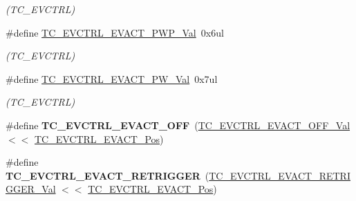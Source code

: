 \begin{DoxyCompactItemize}
\begin{DoxyCompactList}\small\item\em (T\+C\+\_\+\+E\+V\+C\+T\+R\+L) \end{DoxyCompactList}\item 
\hypertarget{group___s_a_m_l21___t_c_gab0aa01d513903be5490afa1e56e27486}{}\#define \hyperlink{group___s_a_m_l21___t_c_gab0aa01d513903be5490afa1e56e27486}{T\+C\+\_\+\+E\+V\+C\+T\+R\+L\+\_\+\+E\+V\+A\+C\+T\+\_\+\+P\+W\+P\+\_\+\+Val}~0x6ul\label{group___s_a_m_l21___t_c_gab0aa01d513903be5490afa1e56e27486}

\begin{DoxyCompactList}\small\item\em (T\+C\+\_\+\+E\+V\+C\+T\+R\+L) \end{DoxyCompactList}\item 
\hypertarget{group___s_a_m_l21___t_c_gae6a07dc676f087732e57795d11096682}{}\#define \hyperlink{group___s_a_m_l21___t_c_gae6a07dc676f087732e57795d11096682}{T\+C\+\_\+\+E\+V\+C\+T\+R\+L\+\_\+\+E\+V\+A\+C\+T\+\_\+\+P\+W\+\_\+\+Val}~0x7ul\label{group___s_a_m_l21___t_c_gae6a07dc676f087732e57795d11096682}

\begin{DoxyCompactList}\small\item\em (T\+C\+\_\+\+E\+V\+C\+T\+R\+L) \end{DoxyCompactList}\item 
\hypertarget{group___s_a_m_l21___t_c_ga60e80a04528abe7447554bfa6e5cb40c}{}\#define {\bfseries T\+C\+\_\+\+E\+V\+C\+T\+R\+L\+\_\+\+E\+V\+A\+C\+T\+\_\+\+O\+F\+F}~(\hyperlink{group___s_a_m_l21___t_c_ga34fd9cc9a5f397f3200ce035f6e7dc2b}{T\+C\+\_\+\+E\+V\+C\+T\+R\+L\+\_\+\+E\+V\+A\+C\+T\+\_\+\+O\+F\+F\+\_\+\+Val}       $<$$<$ \hyperlink{group___s_a_m_l21___t_c_ga29f3c9802b04bc3c9e151e388abf2f08}{T\+C\+\_\+\+E\+V\+C\+T\+R\+L\+\_\+\+E\+V\+A\+C\+T\+\_\+\+Pos})\label{group___s_a_m_l21___t_c_ga60e80a04528abe7447554bfa6e5cb40c}

\item 
\hypertarget{group___s_a_m_l21___t_c_ga9c47ab2b22f40053b548de0af76de4a4}{}\#define {\bfseries T\+C\+\_\+\+E\+V\+C\+T\+R\+L\+\_\+\+E\+V\+A\+C\+T\+\_\+\+R\+E\+T\+R\+I\+G\+G\+E\+R}~(\hyperlink{group___s_a_m_l21___t_c_gad84c852c18be67ba892810f8615c4937}{T\+C\+\_\+\+E\+V\+C\+T\+R\+L\+\_\+\+E\+V\+A\+C\+T\+\_\+\+R\+E\+T\+R\+I\+G\+G\+E\+R\+\_\+\+Val} $<$$<$ \hyperlink{group___s_a_m_l21___t_c_ga29f3c9802b04bc3c9e151e388abf2f08}{T\+C\+\_\+\+E\+V\+C\+T\+R\+L\+\_\+\+E\+V\+A\+C\+T\+\_\+\+Pos})\label{group___s_a_m_l21___t_c_ga9c47ab2b22f40053b548de0af76de4a4}


\end{DoxyCompactItemize}
